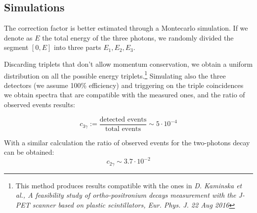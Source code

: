 \documentclass[main.tex]{subfiles}
\begin{document}
\subsection{Simulations}

The correction factor is better estimated through a Montecarlo simulation. If we denote as $E$ the total energy of the three photons, we randomly divided the segment $[0,E]$ into three parts $E_1,E_2,E_3$.


%
%
%

Discarding triplets that don't allow momentum conservation, we obtain a uniform distribution on all the possible energy triplets.\footnote{This method produces results compatible with the ones in \emph{D. Kaminska et al., A feasibility study of ortho-positronium decays measurement with the
J-PET scanner based on plastic scintillators, Eur. Phys. J. 22 Aug 2016}}
Simulating also the three detectors (we assume 100\% efficiency) and triggering on the triple coincidences we obtain spectra that are compatible with the measured ones, and the ratio of observed events results:

\begin{equation*}
  c_{3\gamma} := \frac{\text{detected events}}{\text{total events}} \sim 5\cdot10^{-4}
\end{equation*}

With a similar calculation the ratio of observed events for the two-photons decay can be obtained:
\begin{equation*}
  c_{2\gamma} \sim 3.7\cdot10^{-2}
\end{equation*}
\end{document}
